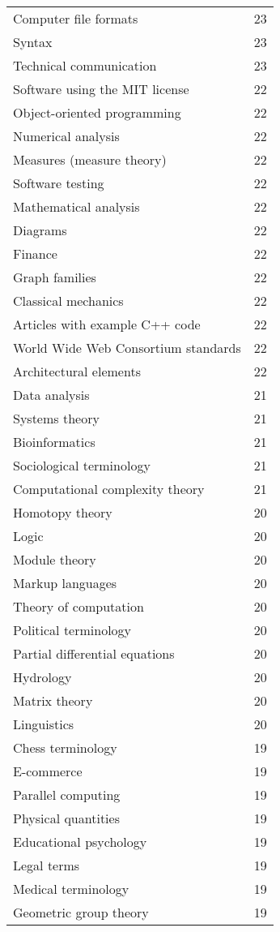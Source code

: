 \begin{appendices}
\begin{longtable} {|| p{20em} | p{5em} ||}
Computer file formats	&	23	\\
Syntax	&	23	\\
Technical communication	&	23	\\
Software using the MIT license	&	22	\\
Object-oriented programming	&	22	\\
Numerical analysis	&	22	\\
Measures (measure theory)	&	22	\\
Software testing	&	22	\\
Mathematical analysis	&	22	\\
Diagrams	&	22	\\
Finance	&	22	\\
Graph families	&	22	\\
Classical mechanics	&	22	\\
Articles with example C++ code	&	22	\\
World Wide Web Consortium standards	&	22	\\
Architectural elements	&	22	\\
Data analysis	&	21	\\
Systems theory	&	21	\\
Bioinformatics	&	21	\\
Sociological terminology	&	21	\\
Computational complexity theory	&	21	\\
Homotopy theory	&	20	\\
Logic	&	20	\\
Module theory	&	20	\\
Markup languages	&	20	\\
Theory of computation	&	20	\\
Political terminology	&	20	\\
Partial differential equations	&	20	\\
Hydrology	&	20	\\
Matrix theory	&	20	\\
Linguistics	&	20	\\
Chess terminology	&	19	\\
E-commerce	&	19	\\
Parallel computing	&	19	\\
Physical quantities	&	19	\\
Educational psychology	&	19	\\
Legal terms	&	19	\\
Medical terminology	&	19	\\
Geometric group theory	&	19	\\

\end{longtable}
\end{appendices}
